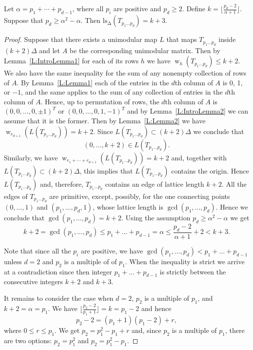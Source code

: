 \documentclass[10pt,a4paper]{amsart}
\newcommand{\ls}{\operatorname{ls_\Delta}}
\newcommand{\w}{\operatorname{w}}
\begin{document}
\begin{Theorem}\label{T:Main1} 
Let $\alpha=p_1+\cdots+p_{d-1}$, where all $p_i$ are positive and $p_d\geq 2$. Define $k=\lfloor\frac{p_d-2}{\alpha+1}\rfloor$.
Suppose that $p_d\geq \alpha^2-\alpha$. Then $\ls(T_{p_1\dots p_d})=k+3$.
\end{Theorem}

\begin{proof}
Suppose that there exists a unimodular map $L$ that maps $T_{p_1\dots p_d}$ inside $(k+2)\Delta$ and let $A$ be the corresponding 
unimodular matrix. Then by Lemma~\ref{L:IntroLemma1} for each of its rows  $h$ we have $\w_{h}(T_{p_1\dots p_d})\leq k+2$. We also have the same 
inequality for the sum of any nonempty collection of rows of $A$. By Lemma~\ref{L:Lemma1} each of the entries in the $d$th column of $A$
is 0, 1, or $-1$, and the same applies to the sum of any collection of entries in the  $d$th column of $A$. Hence, up to permutation of rows, the $d$th column
of $A$ is $(0,0,\dots, 0,\pm 1)^T$ or $(0,0,\dots, 0,1, -1)^T$ and by Lemma~\ref{L:IntroLemma2} we can assume that it is the former. Then by Lemma~\ref{L:Lemma2} we have $\w_{e_{d+1}}(L(T_{p_1\dots p_d}))=k+2$.
Since $L(T_{p_1\dots p_d})\subset (k+2)\Delta$ we conclude that 
$$(0,\dots, k+2)\in L(T_{p_1\dots p_d}).$$ 
Similarly, we have $\w_{e_1+\cdots+e_{d+1}}(L(T_{p_1\dots p_d}))=k+2$ and, together 
with $L(T_{p_1\dots p_d})\subset (k+2)\Delta$, this implies that $L(T_{p_1\dots p_d})$ contains the origin. Hence $L(T_{p_1\dots p_d})$ and, therefore, $T_{p_1\dots p_d}$ contains an edge of lattice length 
$k+2$. All the edges of $T_{p_1\dots p_d}$ are primitive, except, possibly, for the one connecting points $(0,\dots,1)$ and $(p_1,\dots,p_d,1)$, whose lattice length is $\gcd(p_1,\dots,p_d)$.
Hence we conclude that $\gcd(p_1,\dots,p_d)=k+2$.   Using the assumption $p_d\geq \alpha^2-\alpha$ we get
$$k+2=\gcd(p_1,\dots, p_d)\leq p_1+\dots+p_{d-1}=\alpha\leq \frac{p_d-2}{\alpha+1}+2<k+3.
$$

Note that since all the $p_i$ are positive, we have $\gcd(p_1,\dots, p_d)< p_1+\dots+p_{d-1}$ unless $d=2$ and $p_2$ is a multiple of of $p_1$.
When the inequality is strict we arrive  at a contradiction since then integer $p_1+\dots+p_{d-1}$ is strictly between the consecutive integers $k+2$ and $k+3$.

It remains to consider the case when $d=2$, $p_2$ is a multiple of $p_1$, and $k+2=\alpha=p_1$.  
We have $\lfloor\frac{p_2-2}{p_1+1}\rfloor=k=p_1-2$ and hence
$$p_2-2=(p_1+1)(p_1-2)+r,
$$
where $0\leq r\leq p_1$. We get  $p_2=p_1^2-p_1+r$ and, since $p_2$ is a multiple of $p_1$, there are two options: $p_2=p_1^2$ and $p_2=p_1^2-p_1$.


\end{proof}
\end{document}
